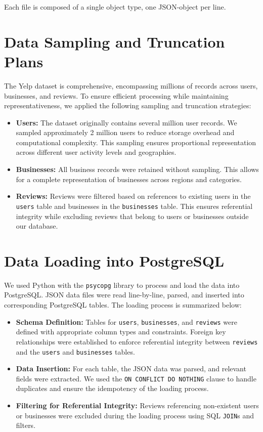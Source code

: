 \documentclass{article}
\begin{document}
Each file is composed of a single object type, one JSON-object per line.


\section{Data Sampling and Truncation Plans}

The Yelp dataset is comprehensive, encompassing millions of records across users, businesses, and reviews. To ensure efficient processing while maintaining representativeness, we applied the following sampling and truncation strategies:

\begin{itemize}
    \item \textbf{Users:} The dataset originally contains several million user records. We sampled approximately 2 million users to reduce storage overhead and computational complexity. This sampling ensures proportional representation across different user activity levels and geographies.
    \item \textbf{Businesses:} All business records were retained without sampling. This allows for a complete representation of businesses across regions and categories.
    \item \textbf{Reviews:} Reviews were filtered based on references to existing users in the \texttt{users} table and businesses in the \texttt{businesses} table. This ensures referential integrity while excluding reviews that belong to users or businesses outside our database.
\end{itemize}

\section{Data Loading into PostgreSQL}



We used Python with the \texttt{psycopg} library to process and load the data into PostgreSQL. JSON data files were read line-by-line, parsed, and inserted into corresponding PostgreSQL tables. The loading process is summarized below:

\begin{itemize}
    \item \textbf{Schema Definition:} Tables for \texttt{users}, \texttt{businesses}, and \texttt{reviews} were defined with appropriate column types and constraints. Foreign key relationships were established to enforce referential integrity between \texttt{reviews} and the \texttt{users} and \texttt{businesses} tables.
    \item \textbf{Data Insertion:} For each table, the JSON data was parsed, and relevant fields were extracted. We used the \texttt{ON CONFLICT DO NOTHING} clause to handle duplicates and ensure the idempotency of the loading process.
    \item \textbf{Filtering for Referential Integrity:} Reviews referencing non-existent users or businesses were excluded during the loading process using SQL \texttt{JOIN}s and filters.
\end{itemize}
\end{document}
